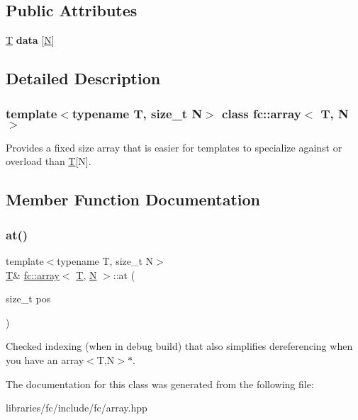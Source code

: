 \subsection*{Public Attributes}
\begin{DoxyCompactItemize}
\item 
\mbox{\label{classfc_1_1array_ad01e4627be17148ee922c37944c48626}} 
\mbox{\hyperlink{struct_t}{T}} {\bfseries data} \mbox{[}\mbox{\hyperlink{group__types_gaf9c1edb0e0da55ec6ba09f32f6839529}{N}}\mbox{]}
\end{DoxyCompactItemize}


\subsection{Detailed Description}
\subsubsection*{template$<$typename T, size\+\_\+t N$>$\newline
class fc\+::array$<$ T, N $>$}

Provides a fixed size array that is easier for templates to specialize against or overload than \mbox{\hyperlink{struct_t}{T}}\mbox{[}N\mbox{]}. 

\subsection{Member Function Documentation}
\mbox{\label{classfc_1_1array_a55e7e4a0eea7f9e72b66fdf2000097d0}} 
\subsubsection{\texorpdfstring{at()}{at()}}
{\footnotesize\ttfamily template$<$typename T, size\+\_\+t N$>$ \\
\mbox{\hyperlink{struct_t}{T}}\& \mbox{\hyperlink{classfc_1_1array}{fc\+::array}}$<$ \mbox{\hyperlink{struct_t}{T}}, \mbox{\hyperlink{group__types_gaf9c1edb0e0da55ec6ba09f32f6839529}{N}} $>$\+::at (\begin{DoxyParamCaption}\item[{size\+\_\+t}]{pos }\end{DoxyParamCaption})\hspace{0.3cm}{\ttfamily [inline]}}

Checked indexing (when in debug build) that also simplifies dereferencing when you have an array$<$\+T,\+N$>$$\ast$. 

The documentation for this class was generated from the following file\+:\begin{DoxyCompactItemize}
\item 
libraries/fc/include/fc/array.\+hpp\end{DoxyCompactItemize}
